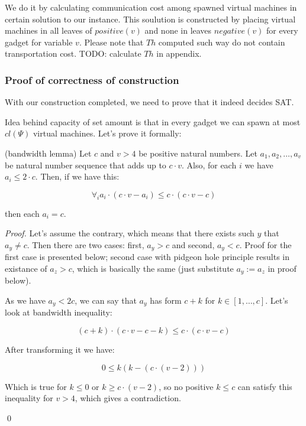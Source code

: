  We
do it by calculating communication cost among spawned virtual machines in
certain solution to our instance. This soulution is constructed by placing
virtual machines in all leaves of $positive(v)$ and none in leaves
$negative(v)$ for every gadget for variable $v$. Please note that $Th$
computed such way do not contain transportation cost. TODO: calculate
$Th$ in appendix.

\subsubsection{Proof of correctness of construction}

With our construction completed, we need to prove that it indeed
decides SAT.

Idea behind capacity of set amount is that in every gadget we can
spawn at most $cl(\Psi)$ virtual machines. Let's prove it formally:

\begin{lemma} (bandwidth lemma)
  Let $c$ and $v > 4$ be positive natural numbers. Let $a_1, a_2, \ldots,
  a_v$ be natural number sequence that adds up to $c \cdot v$. Also, for
  each $i$ we have $a_i \leq 2 \cdot c$. Then, if we have this:

  $$ \forall_i a_i \cdot (c \cdot v - a_i) \leq c \cdot (c \cdot v -
  c) $$

  then each $a_i = c$.
\end{lemma}
\begin{proof}

Let's assume the contrary, which means that there exists such $y$ that
$a_y \neq c$. Then there are two cases: first, $a_y>c$ and second,
$a_y<c$. Proof for the first case is presented below; second case
with pidgeon hole principle results in existance of $a_z > c$, which
is basically the same (just substitute $a_y := a_z$ in proof below).

As we have $a_y < 2c$, we can say that $a_y$ has form $c +
k$ for $k \in [1, \ldots, c]$. Let's look at bandwidth inequality:

$$ (c + k) \cdot (c \cdot v - c - k) \leq c \cdot (c \cdot v - c) $$

After transforming it we have:

$$ 0 \leq k(k - (c \cdot (v - 2))) $$

Which is true for $k \leq 0$ or $k \geq c \cdot (v - 2)$, so no
positive $k \leq c$ can satisfy this inequality for $v > 4$, which gives a contradiction. 

\qed

\end{proof}


